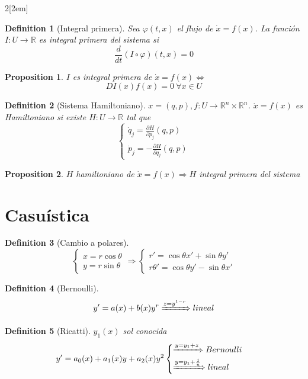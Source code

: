 \documentclass{myclass}
\newtheorem*{definition}{Definition}
\newtheorem*{proposition}{Proposition}
\begin{document}
\begin{multicols}{2}[\columnsep2em]
\begin{definition}[Integral primera] Sea  $\varphi (t, x)$ el flujo de $\dot{x}=f(x)$. La función $I:U\to \mathbb{R}$ es integral primera del sistema si
  \[
  \frac{d }{d t} (I \circ \varphi )(t,x) = 0
  \] 
\end{definition}

\begin{proposition}
$I$ es integral primera de $\dot{x}=f(x) \iff$
\[
DI(x)f(x) = 0 \ \forall x\in U
\] 
\end{proposition}

\begin{definition}[Sistema Hamiltoniano]
$x=(q,p), f:U\to \mathbb{R}^n\times \mathbb{R}^n$. $\dot{x} = f(x)$ es Hamiltoniano si existe $H:U\to \mathbb{R}$ tal que
\[
\begin{cases}
  \dot{q}_j = \frac{\partial H}{\partial p_j}(q,p) \\
  \dot{p}_j = -\frac{\partial H}{\partial q_j}(q,p)
\end{cases}
\] 
\end{definition}

\begin{proposition}
$H$ hamiltoniano de  $\dot{x}=f(x) \Rightarrow H$ integral primera del sistema 
\end{proposition}


\section{Casuística}
\begin{definition}[Cambio a polares]
\[
\begin{cases}
  x = r\cos\theta \\
  y = r\sin\theta 
\end{cases} \Rightarrow 
\begin{cases}
  r' = \cos\theta x' + \sin \theta y'\\
  r\theta ' = \cos \theta y' - \sin \theta x'
\end{cases}
\] 
\end{definition}

\begin{definition}[Bernoulli]
\[
y' = a(x) + b(x)y^{r} \xRightarrow{z=y^{1-r}} lineal
\] 
\end{definition}

\begin{definition}[Ricatti] $y_1(x)$ sol conocida
\[
y' = a_0(x) + a_1(x)y + a_2(x)y^2 \begin{cases}
  \xRightarrow{y = y_1+z} Bernoulli\\
  \xRightarrow{y=y_1+\frac{1}{u}} lineal
\end{cases}
\] 
\end{definition}


\end{multicols}
\end{document}
